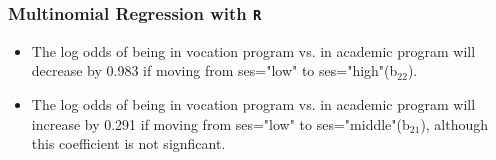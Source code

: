 \documentclass[00-GLMregslides.tex]{subfiles}
\begin{document}
\begin{frame}[fragile]
	
	\frametitle{Multinomial Regression with \texttt{R}}
	\Large
	\begin{itemize}
\item The log odds of being in vocation program vs. in academic program will decrease by 
0.983 if moving from ses="low" to ses="high"(b$_{22}$).
\item The log odds of being in vocation program vs. in academic program 
will increase by 0.291 if moving from ses="low" to ses="middle"(b$_{21}$), although this coefficient is not signficant.
\end{itemize}
\end{frame}
\end{document}
